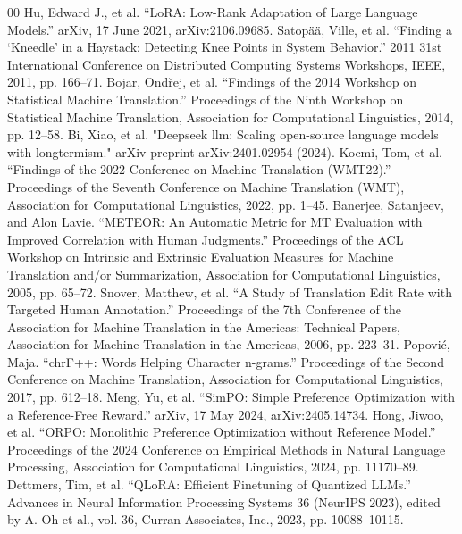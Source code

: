 \documentclass[conference]{IEEEtran}
\begin{document}
\begin{thebibliography}{00}
              Hu, Edward J., et al. “LoRA: Low-Rank Adaptation of Large Language Models.” arXiv, 17 June 2021, arXiv:2106.09685.
              Satopää, Ville, et al. “Finding a ‘Kneedle’ in a Haystack: Detecting Knee Points in System Behavior.” 2011 31st International Conference on Distributed Computing Systems Workshops, IEEE, 2011, pp. 166–71.      
              Bojar, Ondřej, et al. “Findings of the 2014 Workshop on Statistical Machine Translation.” Proceedings of the Ninth Workshop on Statistical Machine Translation, Association for Computational Linguistics, 2014, pp. 12–58.
             Bi, Xiao, et al. "Deepseek llm: Scaling open-source language models with longtermism." arXiv preprint arXiv:2401.02954 (2024).
              Kocmi, Tom, et al. “Findings of the 2022 Conference on Machine Translation (WMT22).” Proceedings of the Seventh Conference on Machine Translation (WMT), Association for Computational Linguistics, 2022, pp. 1–45.
              Banerjee, Satanjeev, and Alon Lavie. “METEOR: An Automatic Metric for MT Evaluation with Improved Correlation with Human Judgments.” Proceedings of the ACL Workshop on Intrinsic and Extrinsic Evaluation Measures for Machine Translation and/or Summarization, Association for Computational Linguistics, 2005, pp. 65–72.
              Snover, Matthew, et al. “A Study of Translation Edit Rate with Targeted Human Annotation.” Proceedings of the 7th Conference of the Association for Machine Translation in the Americas: Technical Papers, Association for Machine Translation in the Americas, 2006, pp. 223–31.
              Popović, Maja. “chrF++: Words Helping Character n-grams.” Proceedings of the Second Conference on Machine Translation, Association for Computational Linguistics, 2017, pp. 612–18.
              Meng, Yu, et al. “SimPO: Simple Preference Optimization with a Reference-Free Reward.” arXiv, 17 May 2024, arXiv:2405.14734.
              Hong, Jiwoo, et al. “ORPO: Monolithic Preference Optimization without Reference Model.” Proceedings of the 2024 Conference on Empirical Methods in Natural Language Processing, Association for Computational Linguistics, 2024, pp. 11170–89.
              Dettmers, Tim, et al. “QLoRA: Efficient Finetuning of Quantized LLMs.” Advances in Neural Information Processing Systems 36 (NeurIPS 2023), edited by A. Oh et al., vol. 36, Curran Associates, Inc., 2023, pp. 10088–10115.

	\end{thebibliography}
	
	
\end{document}
